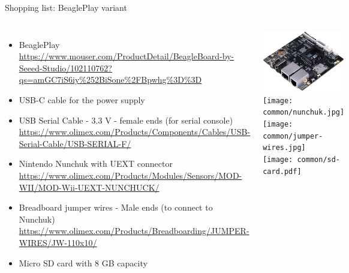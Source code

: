 \begin{frame}[fragile]{Shopping list: BeaglePlay variant}
  \begin{columns}
    \begin{itemize}
    \item BeaglePlay
      {\fontsize{6}{6}\selectfont
        \url{https://www.mouser.com/ProductDetail/BeagleBoard-by-Seeed-Studio/102110762?qs=amGC7iS6iy%252BiSone%2FBpwhg%3D%3D}
      }
    \item USB-C cable for the power supply
    \item USB Serial Cable - 3.3 V - female ends (for serial console)
      {\fontsize{6}{6}\selectfont
        \url{https://www.olimex.com/Products/Components/Cables/USB-Serial-Cable/USB-SERIAL-F/}
      }
    \item Nintendo Nunchuk with UEXT connector
      {\fontsize{6}{6}\selectfont
        \url{https://www.olimex.com/Products/Modules/Sensors/MOD-WII/MOD-Wii-UEXT-NUNCHUCK/}
      }
    \item Breadboard jumper wires - Male ends (to connect to Nunchuk)
      {\fontsize{6}{6}\selectfont
        \url{https://www.olimex.com/Products/Breadboarding/JUMPER-WIRES/JW-110x10/}
      }
    \item Micro SD card with 8 GB capacity
    \end{itemize}
    \begin{center}
      \includegraphics[height=0.2\textheight]{slides/beagleplay-board/beagleplay.png} \\
      \texttt{[image: common/nunchuk.jpg]} \\
      \texttt{[image: common/jumper-wires.jpg]} \\
      \texttt{[image: common/sd-card.pdf]}
    \end{center}
  \end{columns}
\end{frame}